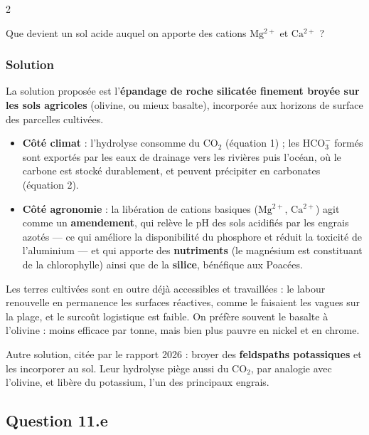 \documentclass[11pt,a4paper]{article}
\providecommand{\tightlist}{\setlength{\itemsep}{0pt}\setlength{\parskip}{0pt}}
\begin{document}
\begin{indication}{2}

Que devient un sol acide auquel on apporte des cations \(\mathrm{Mg^{2+}}\) et \(\mathrm{Ca^{2+}}\) ?

\end{indication}

\hypertarget{solution-39}{%
\subsubsection{Solution}\label{solution-39}}

La solution proposée est l'\textbf{épandage de roche silicatée finement broyée sur les sols agricoles} (olivine, ou mieux basalte), incorporée aux horizons de surface des parcelles cultivées.

\begin{itemize}
\tightlist
\item
  \textbf{Côté climat} : l'hydrolyse consomme du \(\mathrm{CO_2}\) (équation 1) ; les \(\mathrm{HCO_3^-}\) formés sont exportés par les eaux de drainage vers les rivières puis l'océan, où le carbone est stocké durablement, et peuvent précipiter en carbonates (équation 2).
\item
  \textbf{Côté agronomie} : la libération de cations basiques (\(\mathrm{Mg^{2+}}\), \(\mathrm{Ca^{2+}}\)) agit comme un \textbf{amendement}, qui relève le pH des sols acidifiés par les engrais azotés --- ce qui améliore la disponibilité du phosphore et réduit la toxicité de l'aluminium --- et qui apporte des \textbf{nutriments} (le magnésium est constituant de la chlorophylle) ainsi que de la \textbf{silice}, bénéfique aux Poacées.
\end{itemize}

Les terres cultivées sont en outre déjà accessibles et travaillées : le labour renouvelle en permanence les surfaces réactives, comme le faisaient les vagues sur la plage, et le surcoût logistique est faible. On préfère souvent le basalte à l'olivine : moins efficace par tonne, mais bien plus pauvre en nickel et en chrome.

Autre solution, citée par le rapport 2026 : broyer des \textbf{feldspaths potassiques} et les incorporer au sol. Leur hydrolyse piège aussi du \(\mathrm{CO_2}\), par analogie avec l'olivine, et libère du potassium, l'un des principaux engrais.

\hypertarget{question-11.e}{%
\subsection{Question 11.e}\label{question-11.e}}
\end{document}
